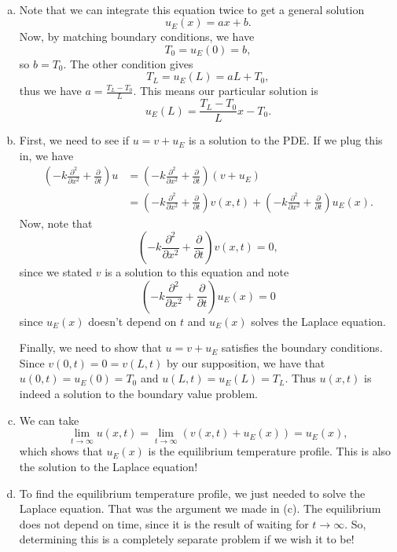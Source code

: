 \documentclass[12pt]{article} %
\begin{document}
\begin{solution}~
\begin{enumerate}[(a)]
    \item Note that we can integrate this equation twice to get a general solution
    \[
    u_E(x) = ax+b.
    \]
    Now, by matching boundary conditions, we have
    \[
    T_0=u_E(0) = b,
    \]
    so $b=T_0$. The other condition gives
    \[
    T_L = u_E(L) = aL+T_0,
    \]
    thus we have $a= \frac{T_L-T_0}{L}$. This means our particular solution is
    \[
    \boxed{    u_E(L) = \frac{T_L-T_0}{L}x - T_0.}
    \]
    
    \item First, we need to see if $u=v+u_E$ is a solution to the PDE.  If we plug this in, we have
    \begin{align*}
    \left( -k\frac{\partial^2}{\partial x^2} + \frac{\partial}{\partial t} \right) u &= \left( -k\frac{\partial^2}{\partial x^2} + \frac{\partial}{\partial t} \right)(v+u_E)\\
    &= \left( -k\frac{\partial^2}{\partial x^2} + \frac{\partial}{\partial t} \right)v(x,t) + \left( -k\frac{\partial^2}{\partial x^2} + \frac{\partial}{\partial t} \right)u_E(x).
    \end{align*}
    Now, note that
    \[
    \left( -k\frac{\partial^2}{\partial x^2} + \frac{\partial}{\partial t} \right)v(x,t) = 0,
    \]
    since we stated $v$ is a solution to this equation and note
    \[
    \left( -k\frac{\partial^2}{\partial x^2} + \frac{\partial}{\partial t} \right)u_E(x) = 0
    \]
    since $u_E(x)$ doesn't depend on $t$ and $u_E(x)$ solves the Laplace equation.
    
    Finally, we need to show that $u=v+u_E$ satisfies the boundary conditions.  Since $v(0,t)=0=v(L,t)$ by our supposition, we have that $u(0,t)=u_E(0)=T_0$ and $u(L,t)=u_E(L)=T_L$. Thus $u(x,t)$ is indeed a solution to the boundary value problem.
    
    \item We can take
    \[
    \lim_{t\to \infty} u(x,t) = \lim_{t\to \infty} \left( v(x,t) + u_E(x) \right) = u_E(x),
    \]
    which shows that $u_E(x)$ is the equilibrium temperature profile.  This is also the solution to the Laplace equation!
    
    \item To find the equilibrium temperature profile, we just needed to solve the Laplace equation.  That was the argument we made in (c). The equilibrium does not depend on time, since it is the result of waiting for $t\to \infty$. So, determining this is a completely separate problem if we wish it to be!
\end{enumerate}
\end{solution}
\end{document}
